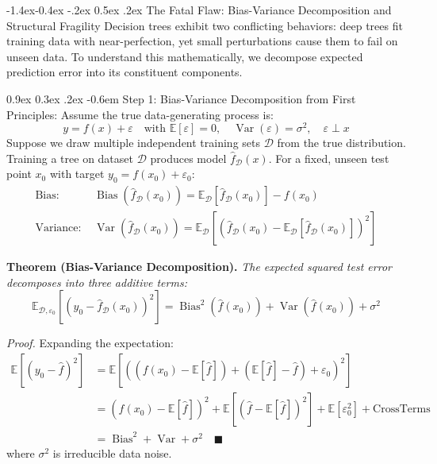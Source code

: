 \documentclass[11pt,a4paper]{article}
\makeatletter
\renewcommand\subsection{\@startsection{subsection}{2}{\z@}%
                                     {-1.4ex\@plus -0.4ex \@minus -.2ex}%
                                     {0.5ex \@plus .2ex}%
                                     {\normalfont\normalsize\bfseries}}
\renewcommand\paragraph{\@startsection{paragraph}{4}{\z@}%
                                     {0.9ex \@plus0.3ex \@minus.2ex}%
                                     {-0.6em}%
                                     {\normalfont\normalsize\bfseries}}
\newcommand{\E}{\mathbb{E}}
\newcommand{\Var}{\operatorname{Var}}
\makeatother
\begin{document}
\subsection{The Fatal Flaw: Bias-Variance Decomposition and Structural Fragility}
Decision trees exhibit two conflicting behaviors: deep trees fit training data with near-perfection, yet small perturbations cause them to fail on unseen data. To understand this mathematically, we decompose expected prediction error into its constituent components.

\paragraph{Step 1: Bias-Variance Decomposition from First Principles:}
Assume the true data-generating process is:
\begin{equation}
    y = f(x) + \varepsilon \quad \text{with } \E[\varepsilon] = 0, \quad \Var(\varepsilon) = \sigma^2, \quad \varepsilon \perp x
\end{equation}
Suppose we draw multiple independent training sets $\mathcal{D}$ from the true distribution. Training a tree on dataset $\mathcal{D}$ produces model $\hat{f}_\mathcal{D}(x)$. For a fixed, unseen test point $x_0$ with target $y_0 = f(x_0) + \varepsilon_0$:
\begin{align}
    \text{Bias: } &\operatorname{Bias}(\hat{f}_\mathcal{D}(x_0)) = \E_\mathcal{D}[\hat{f}_\mathcal{D}(x_0)] - f(x_0) \\
    \text{Variance: } &\Var(\hat{f}_\mathcal{D}(x_0)) = \E_\mathcal{D}\left[ \left( \hat{f}_\mathcal{D}(x_0) - \E_\mathcal{D}[\hat{f}_\mathcal{D}(x_0)] \right)^2 \right]
\end{align}

\textbf{Theorem (Bias-Variance Decomposition).} \emph{The expected squared test error decomposes into three additive terms:}
\begin{equation}
    \E_{\mathcal{D}, \varepsilon_0} \left[ (y_0 - \hat{f}_\mathcal{D}(x_0))^2 \right] = \operatorname{Bias}^2(\hat{f}(x_0)) + \Var(\hat{f}(x_0)) + \sigma^2
\end{equation}

\emph{Proof.} Expanding the expectation:
\begin{align}
    \E\left[ (y_0 - \hat{f})^2 \right] &= \E\left[ \left( (f(x_0) - \E[\hat{f}]) + (\E[\hat{f}] - \hat{f}) + \varepsilon_0 \right)^2 \right] \nonumber \\
    &= (f(x_0) - \E[\hat{f}])^2 + \E\left[ (\hat{f} - \E[\hat{f}])^2 \right] + \E[\varepsilon_0^2] + \text{CrossTerms} \nonumber \\
    &= \operatorname{Bias}^2 + \Var + \sigma^2 \quad \blacksquare
\end{align}
where $\sigma^2$ is irreducible data noise.
\end{document}
